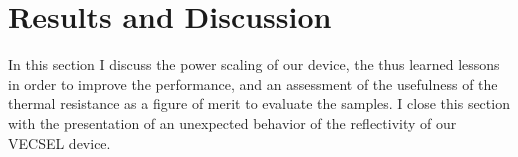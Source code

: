 \section{Results and Discussion}
\label{sec:eval}

In this section
I discuss
the power scaling
of our device,
the thus learned lessons
in order to improve the performance,
and an assessment of
the usefulness
of the thermal resistance
as a figure of merit
to evaluate
the samples.
I close this section
with the presentation
of an unexpected behavior
of the reflectivity
of our VECSEL device.






